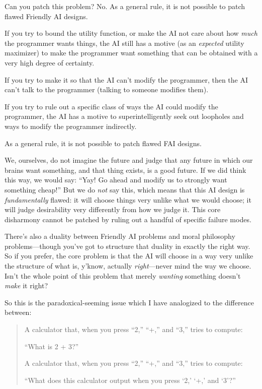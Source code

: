 {
 Can you patch this problem? No. As a general rule, it is not
possible to patch flawed Friendly AI designs.}

{
 If you try to bound the utility function, or make the AI not care
about how \textit{much} the programmer wants things, the AI still has a
motive (as an \textit{expected} utility maximizer) to make the
programmer want something that can be obtained with a very high degree
of certainty.}

{
 If you try to make it so that the AI can't modify
the programmer, then the AI can't talk to the
programmer (talking to someone modifies them).}

{
 If you try to rule out a specific class of ways the AI could
modify the programmer, the AI has a motive to superintelligently seek
out loopholes and ways to modify the programmer indirectly.}

{
 As a general rule, it is not possible to patch flawed FAI
designs.}

{
 We, ourselves, do not imagine the future and judge that any future
in which our brains want something, and that thing exists, is a good
future. If we did think this way, we would say: ``Yay!
Go ahead and modify us to strongly want something
cheap!'' But we do \textit{not} say this, which means
that this AI design is \textit{fundamentally} flawed: it will choose
things very unlike what we would choose; it will judge desirability
very differently from how we judge it. This core disharmony cannot be
patched by ruling out a handful of specific failure modes.}

{
 There's also a duality between Friendly AI
problems and moral philosophy problems---though you've
got to structure that duality in exactly the right way. So if you
prefer, the core problem is that the AI will choose in a way very
unlike the structure of what is, y'know, actually
\textit{right}{}---never mind the way we choose. Isn't
the whole point of this problem that merely \textit{wanting} something
doesn't \textit{make} it right?}

{
 So this is the paradoxical-seeming issue which I have analogized
to the difference between:}

\begin{quotation}
{
 A calculator that, when you press
``2,''
``+,'' and
``3,'' tries to compute:}

{
 ``What is 2 + 3?''}

{
 A calculator that, when you press
``2,''
``+,'' and
``3,'' tries to compute:}

{
 ``What does this calculator output when you press
`2,' `+,'
and `3'?''}
\end{quotation}


